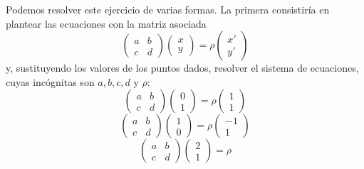 \begin{exa}
	Podemos resolver este ejercicio de varias formas. La primera consistiría en plantear las ecuaciones con la matriz asociada
	\begin{equation*}
		\left( \begin{array}{cc}
			a&b\\ c&d
		\end{array}\right) 
		\left( \begin{array}{c}
			x\\ y
		\end{array}\right)=\rho
		\left( \begin{array}{c}
		x'\\ y'
	\end{array}\right)
	\end{equation*}
	y, sustituyendo los valores de los puntos dados, resolver el sistema de ecuaciones, cuyas incógnitas son $a,b,c,d$ y $\rho$:
	\begin{equation*}
		\left( \begin{array}{cc}
			a&b\\ c&d
		\end{array}\right) 
		\left( \begin{array}{c}
			0\\ 1
		\end{array}\right)=\rho
		\left( \begin{array}{c}
			1\\ 1
		\end{array}\right)
	\end{equation*}
	\begin{equation*}
		\left( \begin{array}{cc}
			a&b\\ c&d
		\end{array}\right) 
		\left( \begin{array}{c}
			1\\ 0
		\end{array}\right)=\rho
		\left( \begin{array}{c}
			-1\\ 1
		\end{array}\right)
	\end{equation*}
	\begin{equation*}
		\left( \begin{array}{cc}
			a&b\\ c&d
		\end{array}\right) 
		\left( \begin{array}{c}
			2\\ 1
		\end{array}\right)=\rho

\end{equation*}
\end{exa}
